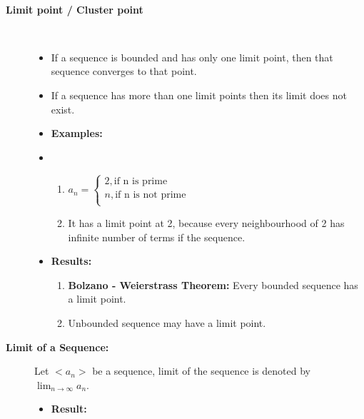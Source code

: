 \documentclass[a4paper]{article}
\begin{document}
\pagebreak

\begin{center}
    \date{$5^{\text{th}}$ September 2021} \\
\end{center}
\begin{description}
    \item[\textbf{Limit point / Cluster point}] \hfill \\
    \begin{itemize}
        \item If a sequence is bounded and has only one limit point, then that sequence
        converges to that point.
        \item If a sequence has more than one limit points then its limit
        does not exist. 
        \item \textbf{Examples:}
        \item[] 
            \begin{enumerate}
                \item 
                    $a_n = 
                        \begin{cases}
                           2, \text{if n is prime} \\
                           n, \text{if n is not prime} \\
                        \end{cases}
                    $
                \item[] It has a limit point at 2, because every 
                neighbourhood of 2 has infinite number of terms if
                the sequence. 
            \end{enumerate}
        \item \textbf{Results:}
            \begin{enumerate}
                \item \textbf{Bolzano - Weierstrass Theorem:} Every
                bounded sequence has a limit point.
                \item Unbounded sequence may have a limit point.
            \end{enumerate}
    \end{itemize}
    \item[\textbf{Limit of a Sequence:}] Let $<a_n>$ be a sequence,
    limit of the sequence is denoted by $\displaystyle\lim_{n \to \infty}a_n$.
    \begin{itemize}
        \item \textbf{Result:}
            \begin{enumerate}

\end{enumerate}
\end{itemize}
\end{description}
\end{document}
